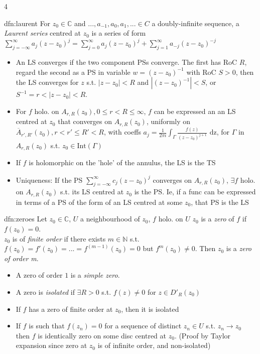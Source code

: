 \documentclass[landscape, 8pt]{extarticle}
\begin{document}
\begin{multicols*}{4}
		
		\begin{dfn}{dfn:laurent}{ }
			For $z_0 \in \mathbb{C}$ and $..., a_{-1}, a_0, a_1, ... \in C$ a doubly-infinite sequence, a \textit{Laurent series} centred at $z_0$ is a series of form $\sum_{j= -\infty}^{\infty}a_j(z-z_0)^j = \sum_{j=0}^{\infty}a_j(z-z_0)^j + \sum_{j=1}^{\infty}a_{-j}(z-z_0)^{-j}$
			\begin{itemize}
				\item An LS converges if the two component PSs converge. The first has RoC $R$, regard the second as a PS in variable $w = (z-z_0)^{-1}$ with RoC $S >0$, then the LS converges for $z$ s.t. $\left|z-z_0\right| <R$ and $\left|(z-z_0)^{-1}\right| <S$, or $S^{-1} = r < \left|z-z_0\right| < R$.
				\item For $f$ holo. on $A_{r, R}(z_0), 0 \le r < R \le \infty$, $f$ can be expressed an an LS centred at $z_0$ that converges on $A_{r, R}(z_0)$, uniformly on $\overline{A}_{r', R'}(z_0), r < r' \le R' < R$, with coeffs $a_j = \frac{1}{2 \pi i} \int_{\Gamma}\frac{f(z)}{(z-z_0)^{j+1}} \text{ dz}$, for $\Gamma$ in $A_{r, R}(z_0)$ s.t. $z_0 \in \text{Int}(\Gamma)$
				\item If $f$ is holomorphic on the 'hole' of the annulus, the LS is the TS
				\item Uniqueness: If the PS $\sum_{j= -\infty}^{\infty} c_j (z-z_0)^j$ converges on $A_{r, R}(z_0)$, $\exists f$ holo. on $A_{r, R}(z_0)$ s.t. its LS centred at $z_0$ is the PS. Ie, if a func can be expressed in terms of a PS of the form of an LS centred at some $z_0$, that PS is the LS
			\end{itemize}
			
			
		\end{dfn}
		
		
		\begin{dfn}[zeroes]{dfn:zeroes}{ }
			Let $z_0 \in \mathbb{C}$, $U$ a neighbourhood of $z_0$, $f$ holo. on $U$
			$z_0$ is a \textit{zero} of $f$ if $f(z_0) = 0$.\\
			$z_0$ is of \textit{finite order} if there exists $m \in \mathbb{N}$ s.t. $f(z_0) = f'(z_0) = ... = f^{(m-1)}(z_0) = 0$ but $f^m(z_0) \ne 0$. Then $z_0$ is a \textit{zero of order m}. 
			\begin{itemize}
				\item A zero of order $1$ is a \textit{simple zero}. 
				\item A zero is \textit{isolated} if $\exists R> 0$ s.t. $f(z) \ne 0$ for $z \in D'_R(z_0)$
				\item If $f$ has a zero of finite order at $z_0$, then it is isolated
				\item If $f$ is such that $f(z_n) = 0$ for a sequence of distinct $z_n \in U$ s.t. $z_n \to z_0$ then $f$ is identically zero on some disc centred at $z_0$. (Proof by Taylor expansion since zero at $z_0$ is of infinite order, and non-isolated)
			

\end{itemize}
\end{dfn}
\end{multicols*}
\end{document}
